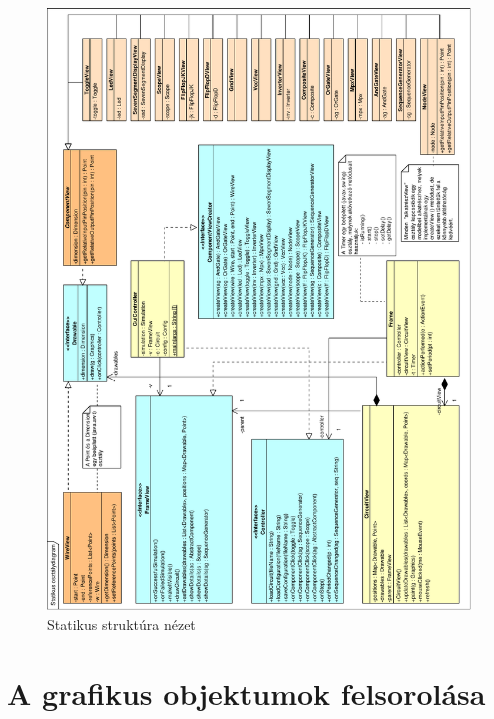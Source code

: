 \begin{figure}[H]
\begin{center}
\includegraphics*[width=17cm]{chapters/chapter11/pdfs/class.pdf}
\caption{Statikus struktúra nézet}
\label{fig:class_diagram}
\end{center}
\end{figure}

\section{A grafikus objektumok felsorolása}









